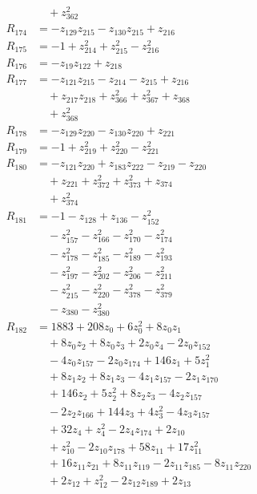 \begin{align*}
&\quad +z_{362}^{2} \\
R_{174} &= -z_{129}z_{215} -z_{130}z_{215} +z_{216} \\
R_{175} &= -1 +z_{214}^{2} +z_{215}^{2} -z_{216}^{2} \\
R_{176} &= -z_{19}z_{122} +z_{218} \\
R_{177} &= -z_{121}z_{215} -z_{214} -z_{215} +z_{216} \\
&\quad +z_{217}z_{218} +z_{366}^{2} +z_{367}^{2} +z_{368} \\
&\quad +z_{368}^{2} \\
R_{178} &= -z_{129}z_{220} -z_{130}z_{220} +z_{221} \\
R_{179} &= -1 +z_{219}^{2} +z_{220}^{2} -z_{221}^{2} \\
R_{180} &= -z_{121}z_{220} +z_{183}z_{222} -z_{219} -z_{220} \\
&\quad +z_{221} +z_{372}^{2} +z_{373}^{2} +z_{374} \\
&\quad +z_{374}^{2} \\
R_{181} &= -1 -z_{128} +z_{136} -z_{152}^{2} \\
&\quad -z_{157}^{2} -z_{166}^{2} -z_{170}^{2} -z_{174}^{2} \\
&\quad -z_{178}^{2} -z_{185}^{2} -z_{189}^{2} -z_{193}^{2} \\
&\quad -z_{197}^{2} -z_{202}^{2} -z_{206}^{2} -z_{211}^{2} \\
&\quad -z_{215}^{2} -z_{220}^{2} -z_{378}^{2} -z_{379}^{2} \\
&\quad -z_{380} -z_{380}^{2} \\
R_{182} &= 1883 +208z_{0} +6z_{0}^{2} +8z_{0}z_{1} \\
&\quad +8z_{0}z_{2} +8z_{0}z_{3} +2z_{0}z_{4} -2z_{0}z_{152} \\
&\quad -4z_{0}z_{157} -2z_{0}z_{174} +146z_{1} +5z_{1}^{2} \\
&\quad +8z_{1}z_{2} +8z_{1}z_{3} -4z_{1}z_{157} -2z_{1}z_{170} \\
&\quad +146z_{2} +5z_{2}^{2} +8z_{2}z_{3} -4z_{2}z_{157} \\
&\quad -2z_{2}z_{166} +144z_{3} +4z_{3}^{2} -4z_{3}z_{157} \\
&\quad +32z_{4} +z_{4}^{2} -2z_{4}z_{174} +2z_{10} \\
&\quad +z_{10}^{2} -2z_{10}z_{178} +58z_{11} +17z_{11}^{2} \\
&\quad +16z_{11}z_{21} +8z_{11}z_{119} -2z_{11}z_{185} -8z_{11}z_{220} \\
&\quad +2z_{12} +z_{12}^{2} -2z_{12}z_{189} +2z_{13} \\

\end{align*}
